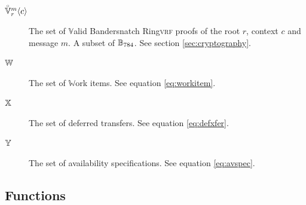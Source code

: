 \begin{description}
  \item[$\bsringproof{r}{c}{m}$] The set of $\mathbb{V}$alid Bandersnatch Ring\textsc{vrf} proofs of the root $r$, context $c$ and message $m$. A subset of $\blob[784]$. See section \ref{sec:cryptography}.
  \item[$\workitem$] The set of $\mathbb{W}$ork items. See equation \ref{eq:workitem}.
  \item[$\defxfer$] The set of deferred transfers. See equation \ref{eq:defxfer}.
  \item[$\avspec$] The set of availability specifications. See equation \ref{eq:avspec}.
\end{description}

\subsection{Functions}

